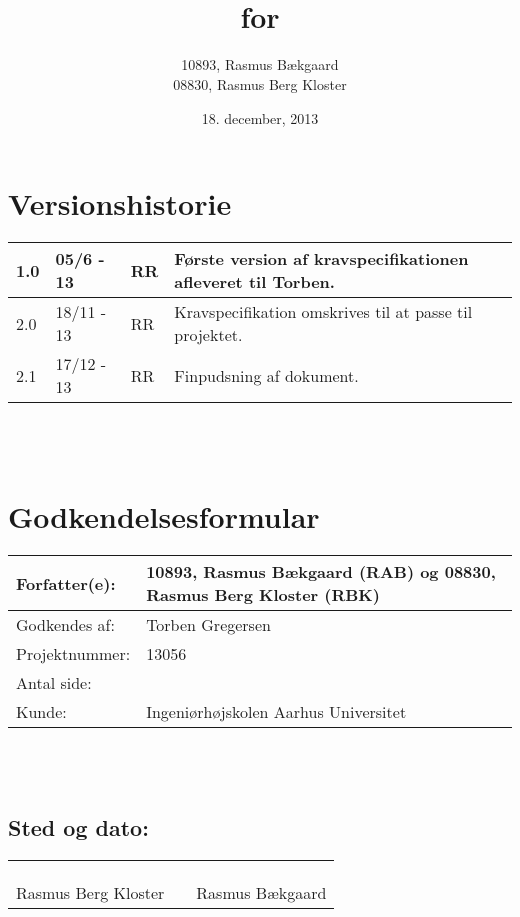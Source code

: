 \documentclass[oneside, 12pt]{memoir}
\title{\DocumentType \\ for \\ \ProjectName}
\date{18. december, 2013}
\author{10893, Rasmus Bækgaard\\08830, Rasmus Berg Kloster}
\begin{document}
\begin{titlingpage}
  \maketitle
\end{titlingpage}


\section*{Versionshistorie}
\begin{tabular}{p{}|p{}|p{}|p{}}
\hline 
1.0 & 05/6 - 13 & RR & Første version af kravspecifikationen afleveret til Torben.
\\ \hline 
2.0 & 18/11 - 13 & RR & Kravspecifikation omskrives til at passe til projektet.
\\\hline 
2.1 & 17/12 - 13 & RR & Finpudsning af dokument.
\\\hline
\end{tabular} 
\\
\\
\section*{Godkendelsesformular}
\begin{tabular}{p{}|p{}}
\hline 
Forfatter(e): & 10893, Rasmus Bækgaard (RAB) og 08830, Rasmus Berg Kloster (RBK)\\ 
\hline 
Godkendes af: & Torben Gregersen \\ 
\hline
Projektnummer: & 13056\\
\hline
Antal side: & \pageref{LastPage} \\
\hline 
Kunde: & Ingeniørhøjskolen Aarhus Universitet \\
\hline
\end{tabular} 
\\
\\
\subsection*{Sted og dato:}
\begin{tabular}{c p{} c}
&& \\
&& \\
\underline{\qquad \qquad \qquad \qquad \qquad \qquad \qquad} & \qquad & \underline{\qquad \qquad \qquad \qquad \qquad \qquad \qquad}  \\ 
Rasmus Berg Kloster & & Rasmus Bækgaard
\end{tabular} 




\newpage
\tableofcontents* %
\newpage
\listoffigures* %

\listoffixmes 








\newpage
\appendix


{\RaggedRight
}
\end{document}
